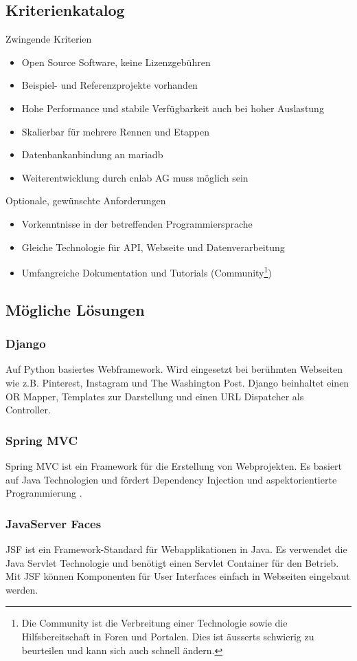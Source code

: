 \subsection{Kriterienkatalog}
Zwingende Kriterien
\begin{itemize}
\item Open Source Software, keine Lizenzgebühren
\item Beispiel- und Referenzprojekte vorhanden
\item Hohe Performance und stabile Verfügbarkeit auch bei hoher Auslastung
\item Skalierbar für mehrere Rennen und Etappen
\item Datenbankanbindung an \gls{mariadb}
\item Weiterentwicklung durch cnlab AG muss möglich sein
\end{itemize}
Optionale, gewünschte Anforderungen
\begin{itemize}
\item Vorkenntnisse in der betreffenden Programmiersprache
\item Gleiche Technologie für API, Webseite und Datenverarbeitung
\item Umfangreiche Dokumentation und Tutorials (Community\footnote{Die Community ist die Verbreitung einer Technologie sowie die Hilfsbereitschaft in Foren und Portalen. Dies ist äusserts schwierig zu beurteilen und kann sich auch schnell ändern.})
\end{itemize}
\subsection{Mögliche Lösungen}
\subsubsection{Django}
Auf Python basiertes Webframework. Wird eingesetzt bei berühmten Webseiten wie z.B. Pinterest, Instagram und The Washington Post.  Django beinhaltet einen OR Mapper, Templates zur Darstellung und einen URL Dispatcher als Controller.
\subsubsection{Spring MVC}
Spring MVC ist ein Framework für die Erstellung von Webprojekten. Es basiert auf Java Technologien und fördert Dependency Injection  und aspektorientierte Programmierung .
\subsubsection{JavaServer Faces}
JSF ist ein Framework-Standard für Webapplikationen in Java. Es verwendet die Java Servlet Technologie und benötigt einen Servlet Container für den Betrieb. Mit JSF können Komponenten für User Interfaces einfach in Webseiten eingebaut werden. 
